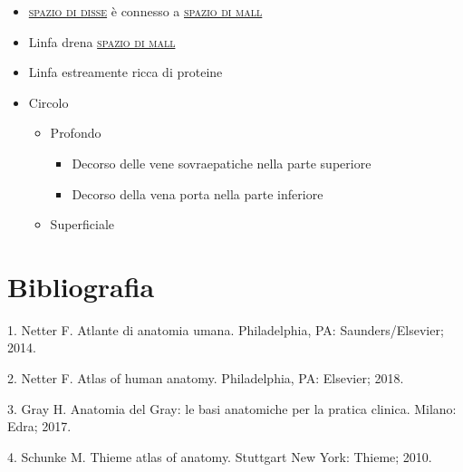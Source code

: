 \documentclass[italian,]{article}
\providecommand{\tightlist}{%
  \setlength{\itemsep}{0pt}\setlength{\parskip}{0pt}}
\renewcommand{\a}[1]{\underline{\textsc{#1}}}
\begin{document}
\begin{itemize}
\tightlist
\item
  \a{spazio di disse} è connesso a \a{spazio di mall}
\item
  Linfa drena \a{spazio di mall}
\item
  Linfa estreamente ricca di proteine
\item
  Circolo

  \begin{itemize}
  \tightlist
  \item
    Profondo

    \begin{itemize}
    \tightlist
    \item
      Decorso delle vene sovraepatiche nella parte superiore
    \item
      Decorso della vena porta nella parte inferiore
    \end{itemize}
  \item
    Superficiale
  \end{itemize}
\end{itemize}

\newpage

\hypertarget{bibliografia}{%
\section*{Bibliografia}\label{bibliografia}}

\hypertarget{refs}{}
\leavevmode\hypertarget{ref-netter2014atlas}{}%
1. Netter F. Atlante di anatomia umana. Philadelphia, PA:
Saunders/Elsevier; 2014.

\leavevmode\hypertarget{ref-netter2018atlas}{}%
2. Netter F. Atlas of human anatomy. Philadelphia, PA: Elsevier; 2018.

\leavevmode\hypertarget{ref-gray2017anatomia}{}%
3. Gray H. Anatomia del Gray: le basi anatomiche per la pratica clinica.
Milano: Edra; 2017.

\leavevmode\hypertarget{ref-schunke2010thieme}{}%
4. Schunke M. Thieme atlas of anatomy. Stuttgart New York: Thieme; 2010.
\end{document}
